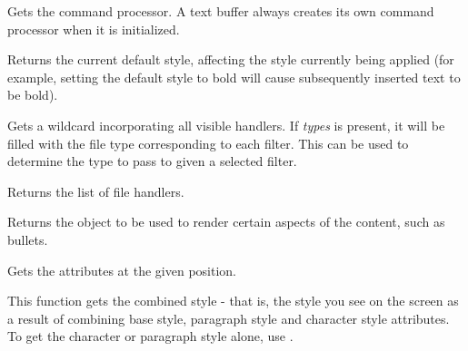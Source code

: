 \label{wxrichtextbuffergetcommandprocessor}


Gets the command processor. A text buffer always creates its own command processor when it is
initialized.

\label{wxrichtextbuffergetdefaultstyle}


Returns the current default style, affecting the style currently being applied (for example, setting the default
style to bold will cause subsequently inserted text to be bold).

\label{wxrichtextbuffergetextwildcard}


Gets a wildcard incorporating all visible handlers. If {\it types} is present,
it will be filled with the file type corresponding to each filter. This can be
used to determine the type to pass to  given a selected filter.

\label{wxrichtextbuffergethandlers}


Returns the list of file handlers.

\label{wxrichtextbuffergetrenderer}


Returns the object to be used to render certain aspects of the content, such as bullets.

\label{wxrichtextbuffergetstyle}



Gets the attributes at the given position.

This function gets the combined style - that is, the style you see on the screen as a result
of combining base style, paragraph style and character style attributes. To get the character
or paragraph style alone, use .

